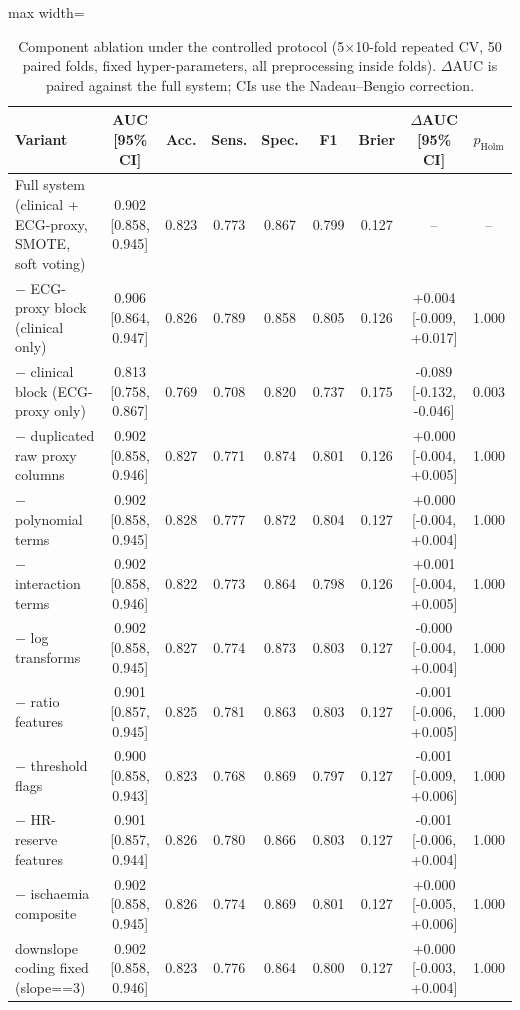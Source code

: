 \begin{table}[!t]
\centering
\scriptsize
\caption{Component ablation under the controlled protocol (5$\times$10-fold repeated CV, 50 paired folds, fixed hyper-parameters, all preprocessing inside folds). $\Delta$AUC is paired against the full system; CIs use the Nadeau--Bengio correction.}
\label{tab:e1}
\setlength{\tabcolsep}{3pt}
\begin{adjustbox}{max width=\linewidth}
\begin{tabular}{lcccccccc}
\toprule
Variant & AUC [95\% CI] & Acc. & Sens. & Spec. & F1 & Brier & $\Delta$AUC [95\% CI] & $p_{\mathrm{Holm}}$ \\
\midrule
Full system (clinical + ECG-proxy, SMOTE, soft voting) & 0.902 [0.858, 0.945] & 0.823 & 0.773 & 0.867 & 0.799 & 0.127 & -- & -- \\
\midrule
$-$ ECG-proxy block (clinical only) & 0.906 [0.864, 0.947] & 0.826 & 0.789 & 0.858 & 0.805 & 0.126 & +0.004 [-0.009, +0.017] & 1.000 \\
$-$ clinical block (ECG-proxy only) & 0.813 [0.758, 0.867] & 0.769 & 0.708 & 0.820 & 0.737 & 0.175 & -0.089 [-0.132, -0.046] & 0.003 \\
\midrule
$-$ duplicated raw proxy columns & 0.902 [0.858, 0.946] & 0.827 & 0.771 & 0.874 & 0.801 & 0.126 & +0.000 [-0.004, +0.005] & 1.000 \\
$-$ polynomial terms & 0.902 [0.858, 0.945] & 0.828 & 0.777 & 0.872 & 0.804 & 0.127 & +0.000 [-0.004, +0.004] & 1.000 \\
$-$ interaction terms & 0.902 [0.858, 0.946] & 0.822 & 0.773 & 0.864 & 0.798 & 0.126 & +0.001 [-0.004, +0.005] & 1.000 \\
$-$ log transforms & 0.902 [0.858, 0.945] & 0.827 & 0.774 & 0.873 & 0.803 & 0.127 & -0.000 [-0.004, +0.004] & 1.000 \\
$-$ ratio features & 0.901 [0.857, 0.945] & 0.825 & 0.781 & 0.863 & 0.803 & 0.127 & -0.001 [-0.006, +0.005] & 1.000 \\
$-$ threshold flags & 0.900 [0.858, 0.943] & 0.823 & 0.768 & 0.869 & 0.797 & 0.127 & -0.001 [-0.009, +0.006] & 1.000 \\
$-$ HR-reserve features & 0.901 [0.857, 0.944] & 0.826 & 0.780 & 0.866 & 0.803 & 0.127 & -0.001 [-0.006, +0.004] & 1.000 \\
$-$ ischaemia composite & 0.902 [0.858, 0.945] & 0.826 & 0.774 & 0.869 & 0.801 & 0.127 & +0.000 [-0.005, +0.006] & 1.000 \\
downslope coding fixed (slope==3) & 0.902 [0.858, 0.946] & 0.823 & 0.776 & 0.864 & 0.800 & 0.127 & +0.000 [-0.003, +0.004] & 1.000 \\

\end{tabular}
\end{adjustbox}
\end{table}
